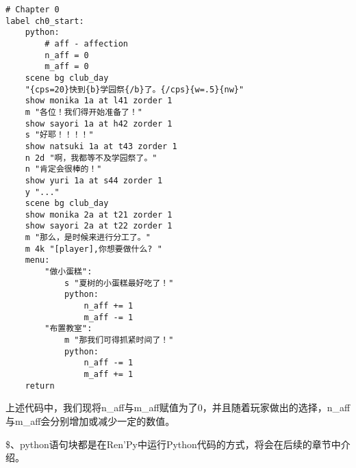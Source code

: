 \documentclass[../../Main.tex]{subfiles}
\begin{document}
\begin{lstlisting}[caption=script-ch1.rpy]
# Chapter 0
label ch0_start:
    python:
        # aff - affection
        n_aff = 0
        m_aff = 0
    scene bg club_day
    "{cps=20}快到{b}学园祭{/b}了。{/cps}{w=.5}{nw}"
    show monika 1a at l41 zorder 1
    m "各位！我们得开始准备了！"
    show sayori 1a at h42 zorder 1
    s "好耶！！！！"
    show natsuki 1a at t43 zorder 1
    n 2d "啊，我都等不及学园祭了。"
    n "肯定会很棒的！"
    show yuri 1a at s44 zorder 1
    y "..."
    scene bg club_day
    show monika 2a at t21 zorder 1
    show sayori 2a at t22 zorder 1
    m "那么，是时候来进行分工了。"
    m 4k "[player],你想要做什么? "
    menu:
        "做小蛋糕":
            s "夏树的小蛋糕最好吃了！"
            python:
                n_aff += 1
                m_aff -= 1
        "布置教室":
            m "那我们可得抓紧时间了！"
            python:
                n_aff -= 1
                m_aff += 1
    return
\end{lstlisting}

上述代码中，我们现将n\_aff与m\_aff赋值为了0，并且随着玩家做出的选择，n\_aff与m\_aff会分别增加或减少一定的数值。

\begin{ExtraKnowledge}
    \$、python语句块都是在Ren'Py中运行Python代码的方式，将会在后续的章节中介绍。
\end{ExtraKnowledge}
\end{document}
